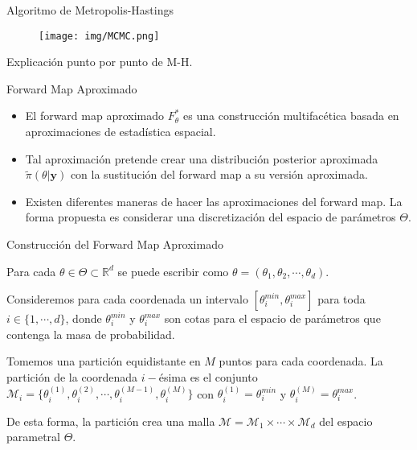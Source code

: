 \documentclass[10pt,aspectratio=169]{beamer}
\begin{document}
\begin{frame}{Algoritmo de Metropolis-Hastings}
  \begin{figure}[H] 
    \centering 
    \texttt{[image: img/MCMC.png]} 
    \label{Fig. M-H}
  \end{figure} 
\end{frame}

\begin{frame}
  Explicación punto por punto de M-H.
\end{frame}

\begin{frame}{Forward Map Aproximado}
  
  \begin{itemize}
    \item 
    El forward map aproximado $F_{\theta}^{*}$ es una construcción multifacética basada en aproximaciones de estadística espacial. 
    \vspace{0.5 cm}
    \item
    Tal aproximación pretende crear una distribución posterior aproximada $\tilde{\pi}(\theta|\mathbf{y})$ con la sustitución del forward map a su versión aproximada.
    \item 
    \vspace{0.5 cm}
    Existen diferentes maneras de hacer las aproximaciones del forward map. La forma propuesta es considerar una discretización del espacio de parámetros $\Theta$.
  \end{itemize}
  



\end{frame}

\begin{frame}{Construcción del Forward Map Aproximado}

  Para cada $\theta \in \Theta \subset \mathbb{R}^d$ se puede escribir como $\theta = (\theta_1, \theta_2, \cdots, \theta_d)$.

  Consideremos para cada coordenada un intervalo $[\theta_i^{min},\theta_i^{max}]$ para toda $i \in \{1,\cdots,d\}$, donde $\theta_i^{min}$ y $\theta_i^{max}$ son cotas para el espacio de parámetros que contenga la masa de probabilidad.
  
  Tomemos una partición equidistante en $M$ puntos para cada coordenada. La partición de la coordenada $i-$ésima es el conjunto $\mathcal{M}_i =\{ \theta_i^{(1)}, \theta_i^{(2)},\cdots , \theta_i^{(M-1)}, \theta_i^{(M)}\}$ con $\theta_i^{(1)} = \theta_i^{min}$ y $\theta_i^{(M)} = \theta_i^{max}$.

  De esta forma, la partición crea una malla $\mathcal{M} = \mathcal{M}_1 \times \cdots \times \mathcal{M}_d$ del espacio parametral $\Theta$.

\end{frame}
\end{document}
